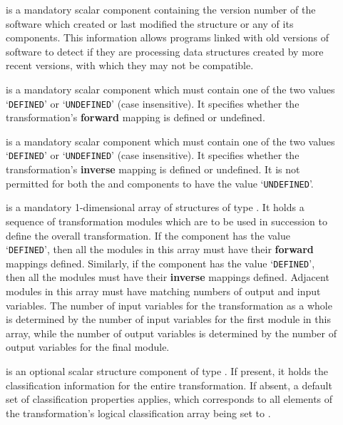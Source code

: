\begin{description}

\item[{\bf {}}] is a mandatory scalar  component
containing the version number of the  software which created
or last modified the  structure or any of its
components. 
This information allows programs linked with old versions of
 software to detect if they are processing data structures
created by more recent versions, with which they may not be compatible. 

\item[{\bf {}}] is a mandatory scalar  component which
must contain one of the two values `\verb#DEFINED#' or `\verb#UNDEFINED#' (case
insensitive). 
It specifies whether the transformation's {\bf forward} mapping is defined
or undefined. 

\item[{\bf {}}] is a mandatory scalar  component which
must contain one of the two values `\verb#DEFINED#' or `\verb#UNDEFINED#' (case
insensitive). 
It specifies whether the transformation's {\bf inverse} mapping is defined
or undefined.
It is not permitted for both the  and  
components to have the value `\verb#UNDEFINED#'.

\item[{\bf {}}] is a mandatory 1-dimensional array of
structures of type .
It holds a sequence of transformation modules which are to be used in
succession to define the overall transformation.
If the  component has the value `\verb#DEFINED#', then all the
modules in this array must have their {\bf forward} mappings defined.
Similarly, if the  component has the value `\verb#DEFINED#', then
all the modules must have their {\bf inverse} mappings defined.
Adjacent modules in this array must have matching numbers of output and input
variables. 
The number of input variables for the transformation as a whole is
determined by the number of input variables for the first module in this
array, while the number of output variables is determined by the number of
output variables for the final module. 

\item[{\bf {}}] is an optional scalar structure component
of type .  If present, it holds the classification
information for the entire transformation.  If absent, a default set of
classification properties applies, which corresponds to all elements of the
transformation's logical classification array being set to .

\end{description}


